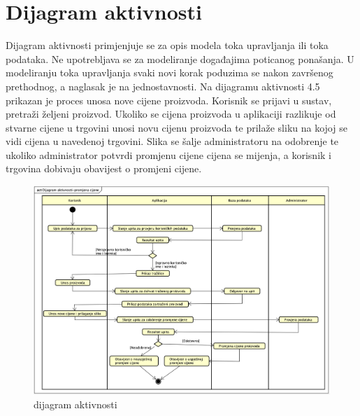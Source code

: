 			
			\eject 
		
		\section{Dijagram aktivnosti}
			
			
			 Dijagram aktivnosti primjenjuje se za opis modela toka upravljanja ili toka podataka. Ne upotrebljava se za modeliranje događajima poticanog ponašanja. U modeliranju toka upravljanja svaki novi korak poduzima se nakon završenog prethodnog, a naglasak je na jednostavnosti. Na dijagramu aktivnosti 4.5 prikazan je proces unosa nove cijene proizvoda. Korisnik se prijavi u sustav, pretraži željeni proizvod. Ukoliko se cijena proizvoda u aplikaciji razlikuje od stvarne cijene u trgovini unosi novu cijenu proizvoda te prilaže sliku na kojoj se vidi cijena u navedenoj trgovini. Slika se šalje administratoru na odobrenje te ukoliko administrator potvrdi promjenu cijene cijena se mijenja, a korisnik i trgovina dobivaju obavijest o promjeni cijene.
			 
			 \begin{figure}[H]
			 	\includegraphics[width=\textwidth]{slike/DijagramAktivnosti.png} %
			 	\caption{dijagram aktivnosti}
			 	\label{fig:dijagramAktivnosti} %
			 \end{figure}
			
